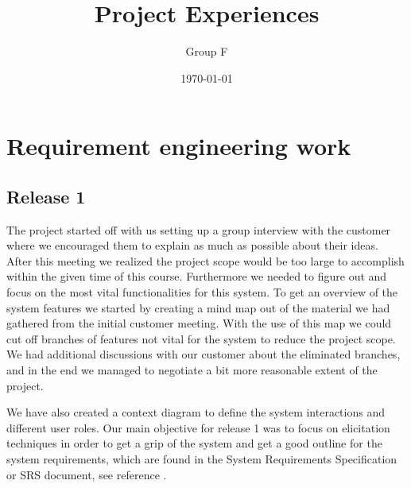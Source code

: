 \documentclass[10pt]{article}
\begin{document}
\makeatletter
\renewcommand{\@biblabel}[1]{\quad#1.}
\makeatother





\begin{titlepage}
\title{Project Experiences}
\author{Group F}
\date{\today}
\maketitle
\thispagestyle{empty}
\end{titlepage}

\tableofcontents
\thispagestyle{empty}
\newpage
{}

\section{Requirement engineering work}
\subsection{Release 1}
The project started off with us setting up a group interview with the customer where we encouraged them to explain as much as possible about their ideas. After this meeting we realized the project scope would be too large to accomplish within the given time of this course. Furthermore we needed to figure out and focus on the most vital functionalities for this system.
To get an overview of the system features we started by creating a mind map out of the material we had gathered from the initial customer meeting. With the use of this map we could cut off branches of features not vital for the system to reduce the project scope.
We had additional discussions with our customer about the eliminated branches, and in the end we managed to negotiate a bit more reasonable extent of the project.

\noindent We have also created a context diagram to define the system interactions and different user roles.
Our main objective for release 1 was to focus on elicitation techniques in order to get a grip of the system and get a good outline for the system requirements, which are found in the System Requirements Specification or SRS document, see reference \cite{srs}.
\end{document}

